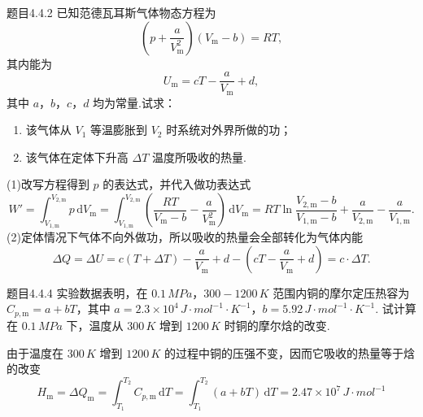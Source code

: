 \begin{question}{题目4.4.2}
    已知范德瓦耳斯气体物态方程为
    $$
        \left(p+\frac{a}{V_\mathrm{m}^2}\right)\left(V_\mathrm{m}-b\right) = RT,
    $$
    其内能为
    $$
        U_\mathrm{m} = cT - \frac{a}{V_\mathrm{m}} + d,
    $$
    其中 $a$，$b$，$c$，$d$ 均为常量.试求：
    \begin{enumerate}
        \item[(1)] 该气体从 $V_1$ 等温膨胀到 $V_2$ 时系统对外界所做的功；
        \item[(2)] 该气体在定体下升高 $\Delta T$ 温度所吸收的热量.
    \end{enumerate}
\end{question}
\begin{solution}
    (1)改写方程得到 $p$ 的表达式，并代入做功表达式
    $$
        W' = \int_{V_\mathrm{1,m}}^{V_\mathrm{2,m}} p \,\mathrm{d}V_\mathrm{m}
        = \int_{V_\mathrm{1,m}}^{V_\mathrm{2,m}} \left(\frac{RT}{V_\mathrm{m}-b} - \frac{a}{V_\mathrm{m}^2} \right) \,\mathrm{d}V_\mathrm{m}
        = RT\ln\frac{V_\mathrm{2,m} - b}{V_\mathrm{1,m} - b} + \frac{a}{V_\mathrm{2,m}} - \frac{a}{V_\mathrm{1,m}}.
    $$
    (2)定体情况下气体不向外做功，所以吸收的热量会全部转化为气体内能
    $$
        \Delta{Q} = \Delta{U} = c( T + \Delta T ) - \frac{a}{V_\mathrm{m}} + d -\left(cT - \frac{a}{V_\mathrm{m}} + d\right) = c \cdot \Delta{T}.
    $$
\end{solution}

\begin{question}{题目4.4.4}
    实验数据表明，在 $0.1 \,\si{MPa}$，$300-1200 \,\si{K}$ 范围内铜的摩尔定压热容为 $C_{p,\mathrm{m}} = a + bT$，其中 $a = 2.3 \times 10^{4} \,\si{J \cdot mol^{-1} \cdot K^{-1}}$，$b = 5.92 \,\si{J \cdot mol^{-1} \cdot K^{-1}}$. 试计算在 $0.1 \,\si{MPa}$ 下，温度从 $300\,\si{K}$ 增到 $1200\,\si{K}$ 时铜的摩尔焓的改变.
\end{question}
\begin{solution}
    由于温度在 $300 \,\si{K}$ 增到 $1200\,\si{K}$ 的过程中铜的压强不变，因而它吸收的热量等于焓的改变
    $$
        H_\mathrm{m} = \Delta{Q}_\mathrm{m} = \int_{T_1}^{T_2} C_{p,\mathrm{m}} \,\mathrm{d}T = \int_{T_1}^{T_2} (a+bT) \,\mathrm{d}T = 2.47 \times 10^7 \,\si{J \cdot mol^{-1}}
    $$
\end{solution}

